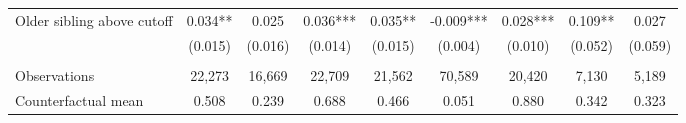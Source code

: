 {{\begin{tabular}{lcccccccc}
Older sibling above cutoff&       0.034** &       0.025   &       0.036***&       0.035** &      -0.009***&       0.028***&       0.109** &       0.027   \\
                    &     (0.015)   &     (0.016)   &     (0.014)   &     (0.015)   &     (0.004)   &     (0.010)   &     (0.052)   &     (0.059)   \\
                    &               &               &               &               &               &               &               &               \\
Observations        &      22,273   &      16,669   &      22,709   &      21,562   &      70,589   &      20,420   &       7,130   &       5,189   \\
Counterfactual mean &       0.508   &       0.239   &       0.688   &       0.466   &       0.051   &       0.880   &       0.342   &       0.323   \\
 

\bottomrule
\end{tabular}
}
}
